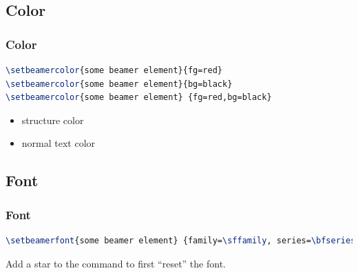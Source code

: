 \documentclass[11pt,pdf,aspectratio=43]{beamer}
\begin{document}
\subsection*{Color}
\begin{frame}[fragile]
    \frametitle{Color}

    \begin{lstlisting}[language=TeX]
\setbeamercolor{some beamer element}{fg=red}
\setbeamercolor{some beamer element}{bg=black}
\setbeamercolor{some beamer element} {fg=red,bg=black}
    \end{lstlisting}

    \begin{itemize}
	\item structure color
	\item normal text color
    \end{itemize}

\end{frame}


\subsection*{Font}
\begin{frame}[fragile]
    \frametitle{Font}
    \begin{lstlisting}[language=TeX]
\setbeamerfont{some beamer element} {family=\sffamily, series=\bfseries, shape=\itshape, size=\large}
    \end{lstlisting}
    Add a star to the command to first ``reset'' the font.
\end{frame}
\end{document}
